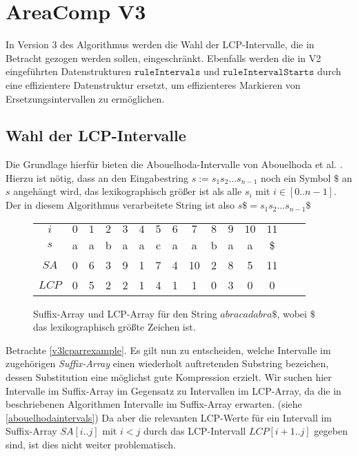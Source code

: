 \section{AreaComp V3}

In Version 3 des Algorithmus werden die Wahl der LCP-Intervalle, die in Betracht gezogen werden sollen, eingeschränkt. Ebenfalls werden die in V2 eingeführten Datenstrukturen $\texttt{ruleIntervals}$ und $\texttt{ruleIntervalStarts}$ durch eine effizientere Datenstruktur ersetzt, um effizienteres Markieren von Ersetzungsintervallen zu ermöglichen. 

\subsection{Wahl der LCP-Intervalle}

Die Grundlage hierfür bieten die Abouelhoda-Intervalle von Abouelhoda et al. \cite{abouelhoda_optimal_2002}.
Hierzu ist nötig, dass an den Eingabestring $s := s_1s_2\dots s_{n-1}$ noch ein Symbol $\$$ an $s$ angehängt wird, das lexikographisch größer ist als alle $s_i$ mit $i \in [0..n-1]$. Der in diesem Algorithmus verarbeitete String ist also $s\$ = s_1s_2\dots s_{n-1}\$$
\begin{figure}
	\centering
    \begin{tabular}{c|c|c|c|c|c|c|c|c|c|c|c|c|c|c|}
        \multicolumn{1}{c}{$i$} & \multicolumn{1}{c}{$0$} & \multicolumn{1}{c}{$1$} & \multicolumn{1}{c}{$2$} & \multicolumn{1}{c}{$3$} & \multicolumn{1}{c}{$4$} & \multicolumn{1}{c}{$5$} & \multicolumn{1}{c}{$6$} & \multicolumn{1}{c}{$7$} & \multicolumn{1}{c}{$8$} & \multicolumn{1}{c}{$9$} & \multicolumn{1}{c}{$10$} & \multicolumn{1}{c}{$11$}\\\cline{2-13}
        $s$   & a & a & b & a & a & c & a & a & b & a & a & \$\\\cline{2-13}
        $SA$  & 0 & 6 & 3 & 9 & 1 & 7 & 4 & 10 & 2 & 8 & 5 & 11\\\cline{2-13}
        $LCP$ & 0 & 5 & 2 & 2 & 1 & 4 & 1 & 1 & 0 & 3 & 0 & 0\\\cline{2-13}
    \end{tabular}
    \caption{Suffix-Array und LCP-Array für den String $abracadabra\$$, wobei $\$$ das lexikographisch größte Zeichen ist.}
    \label{v3lcparrexample}
\end{figure}

Betrachte \autoref{v3lcparrexample}.
Es gilt nun zu entscheiden, welche Intervalle im zugehörigen \emph{Suffix-Array} einen wiederholt auftretenden Substring bezeichen, dessen Substitution eine möglichst gute Kompression erzielt.
Wir suchen hier Intervalle im Suffix-Array im Gegensatz zu Intervallen im LCP-Array, da die in \cite{abouelhoda_optimal_2002} beschriebenen Algorithmen Intervalle im Suffix-Array erwarten. (siehe \autoref{abouelhodaintervals})
Da aber die relevanten LCP-Werte für ein Intervall im Suffix-Array $SA[i..j]$ mit $i < j$ durch das LCP-Intervall $LCP[i+1..j]$ gegeben sind, ist dies nicht weiter problematisch. 

